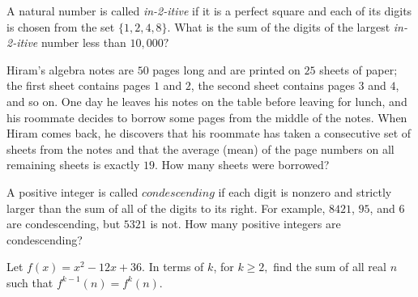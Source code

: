 \documentclass[mast]{lucky}
\begin{document}
\begin{prob}[CMC 10A 2021/13]{6}
A natural number is called \textit{in-2-itive} if it is a perfect square and each of its digits is chosen from the set $\{1,2,4,8\}.$ What is the sum of the digits of the largest \textit{in-2-itive} number less than $10,000?$
\end{prob}

\begin{req}[AMC 10A 2021/22]{6}
Hiram's algebra notes are $50$ pages long and are printed on $25$ sheets of paper; the first sheet contains pages $1$ and $2$, the second sheet contains pages $3$ and $4$, and so on. One day he leaves his notes on the table before leaving for lunch, and his roommate decides to borrow some pages from the middle of the notes. When Hiram comes back, he discovers that his roommate has taken a consecutive set of sheets from the notes and that the average (mean) of the page numbers on all remaining sheets is exactly $19$. How many sheets were borrowed?
\end{req}

\begin{prob}[CMC 10A 2021/19]{6}
A positive integer is called $\textit{condescending}$ if each digit is nonzero and strictly larger than the sum of all of the digits to its right. For example, $8421$, $95$, and $6$ are condescending, but $5321$ is not. How many positive integers are condescending?
\end{prob}

\begin{prob}{9}
Let $f(x)=x^2-12x+36.$ In terms of $k$, for $k\geq 2,$ find the sum of all real $n$ such that $f^{k-1}(n)=f^k(n).$
\end{prob}
\end{document}

